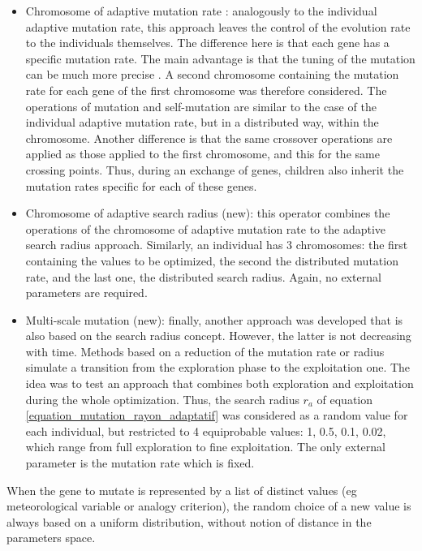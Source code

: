 \documentclass[twocol]{ametsoc}
\begin{document}
\begin{itemize}
	\item Chromosome of adaptive mutation rate \citep[or \textit{n adaptative mutation rate},][]{Back1992a}: analogously to the individual adaptive mutation rate, this approach leaves the control of the evolution rate to the individuals themselves. The difference here is that each gene has a specific mutation rate. The main advantage is that the tuning of the mutation can be much more precise \citep{Smith1997a}. A second chromosome containing the mutation rate for each gene of the first chromosome was therefore considered. The operations of mutation and self-mutation are similar to the case of the individual adaptive mutation rate, but in a distributed way, within the chromosome. Another difference is that the same crossover operations are applied as those applied to the first chromosome, and this for the same crossing points. Thus, during an exchange of genes, children also inherit the mutation rates specific for each of these genes.
	
	\item Chromosome of adaptive search radius (new): this operator combines the operations of the chromosome of adaptive mutation rate to the adaptive search radius approach. Similarly, an individual has 3 chromosomes: the first containing the values to be optimized, the second the distributed mutation rate, and the last one, the distributed search radius. Again, no external parameters are required.
	
	\item Multi-scale mutation (new): finally, another approach was developed that is also based on the search radius concept. However, the latter is not decreasing with time. Methods based on a reduction of the mutation rate or radius simulate a transition from the exploration phase to the exploitation one. The idea was to test an approach that combines both exploration and exploitation during the whole optimization. Thus, the search radius $r_{a}$ of equation \ref{equation_mutation_rayon_adaptatif} was considered as a random value for each individual, but restricted to 4 equiprobable values: 1, 0.5, 0.1, 0.02, which range from full exploration to fine exploitation. The only external parameter is the mutation rate which is fixed.
	
	
\end{itemize}

When the gene to mutate is represented by a list of distinct values (eg meteorological variable or analogy criterion), the random choice of a new value is always based on a uniform distribution, without notion of distance in the parameters space.
\end{document}
